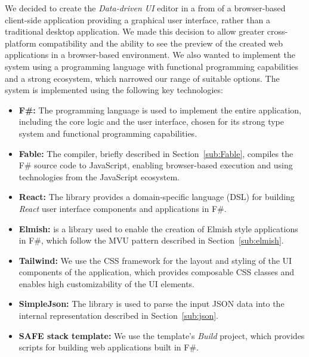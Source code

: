 We decided to create the \emph{Data-driven UI} editor in a from of a browser-based client-side application providing a graphical user interface, rather than a traditional desktop application.
We made this decision to allow greater cross-platform compatibility and the ability to see the preview of the created web applications in a browser-based environment.
We also wanted to implement the system using a programming language with functional programming capabilities and a strong ecosystem, which narrowed our range of suitable options.
The system is implemented using the following key technologies:
\begin{itemize}
	\item \textbf{F\#:} The \citet{fsharp} programming language is used to implement the entire application, including the core logic and the user interface, chosen for its strong type system and functional programming capabilities.
	\item \textbf{Fable:} The \citet{fable} compiler, briefly described in Section~\ref{sub:Fable}, compiles the F\# source code to JavaScript, enabling browser-based execution and using technologies from the JavaScript ecosystem.
	\item \textbf{React:} The \citet{feliz} library provides a domain-specific language (DSL) for building \emph{React} user interface components and applications in F\#.
	\item \textbf{Elmish:} \citet{elmish} is a library used to enable the creation of Elmish style applications in F\#, which follow the MVU pattern described in Section~\ref{sub:elmish}.
	\item \textbf{Tailwind:} We use the \citet{tailwind} CSS framework for the layout and styling of the UI components of the application, which provides composable CSS classes and enables high customizability of the UI elements.
	\item \textbf{SimpleJson:} The \citet{simpleJson} library is used to parse the input JSON data into the internal representation described in Section~\ref{sub:json}.
	\item \textbf{SAFE stack template:} We use the \citet{safestack} template's \emph{Build} project, which provides scripts for building web applications built in F\#.
\end{itemize}


